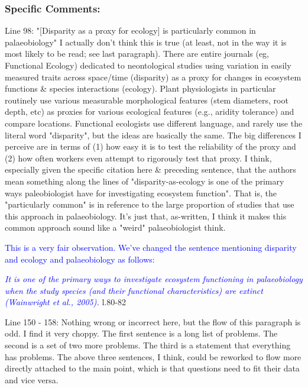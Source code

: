 \documentclass[12pt,letterpaper]{article}
\begin{document}
\subsubsection{Specific Comments:}

\noindent Line 98: "[Disparity as a proxy for ecology] is particularly common in palaeobiology" I actually don't think this is true (at least, not in the way it is most likely to be read; see last paragraph). There are entire journals (eg, Functional Ecology) dedicated to neontological studies using variation in easily measured traits across space/time (disparity) as a proxy for changes in ecosystem functions \& species interactions (ecology). Plant physiologists in particular routinely use various measurable morphological features (stem diameters, root depth, etc) as proxies for various ecological features (e.g., aridity tolerance) and compare locations. 
Functional ecologists use different language, and rarely use the literal word "disparity", but the ideas are basically the same. The big differences I perceive are in terms of (1) how easy it is to test the reliability of the proxy and (2) how often workers even attempt to rigorously test that proxy. 
I think, especially given the specific citation here \& preceding sentence, that the authors mean something along the lines of "disparity-as-ecology is one of the primary ways paleobiologist have for investigating ecosystem function". That is, the "particularly common" is in reference to the large proportion of studies that use this approach in palaeobiology. It's just that, as-written, I think it makes this common approach sound like a "weird" palaeobiologist think.

\textcolor{blue}{This is a very fair observation. We've changed the sentence mentioning disparity and ecology and palaeobiology as follows:}

\textcolor{blue}{\textit{It is one of the primary ways to investigate ecosystem functioning in palaeobiology when the study species (and their functional characteristics) are extinct (Wainwright et al., 2005).}} l.80-82 %

\noindent Line 150 - 158: Nothing wrong or incorrect here, but the flow of this paragraph is odd. I find it very choppy. The first sentence is a long list of problems. The second is a set of two more problems. The third is a statement that everything has problems. The above three sentences, I think, could be reworked to flow more directly attached to the main point, which is that questions need to fit their data and vice versa.
\end{document}
